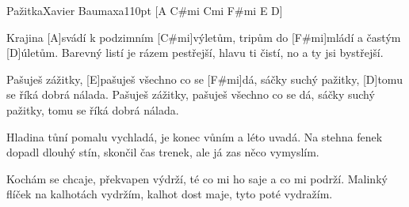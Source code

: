 \begin{song}{Pažitka}{Xavier Baumaxa}{110pt}
[A C#mi Cmi F#mi E D]{}

%
Krajina [A]svádí k podzimním [C#mi]výletům,
tripům do [F#mi]mládí a častým [D]{ú}letům.
Barevný listí je rázem pestřejší,
hlavu ti čistí, no a ty jsi bystřejší.

\chorus%
[A]Pašuješ zážitky, [E]pašuješ všechno co se [F#mi]dá,
sáčky suchý pažitky, [D]tomu se říká dobrá nálada.
Pašuješ zážitky, pašuješ všechno co se dá,
sáčky suchý pažitky, tomu se říká dobrá nálada.

%
Hladina tůní pomalu vychladá,
je konec vůním a léto uvadá.
Na stehna fenek dopadl dlouhý stín,
skončil čas trenek, ale já zas něco vymyslím.
\repchor

%
Kochám se chcaje, překvapen výdrží,
té co mi ho saje a co mi podrží.
Malinký flíček na kalhotách vydržím,
kalhot dost maje, tyto poté vydražím.
\repchor

\end{song}
